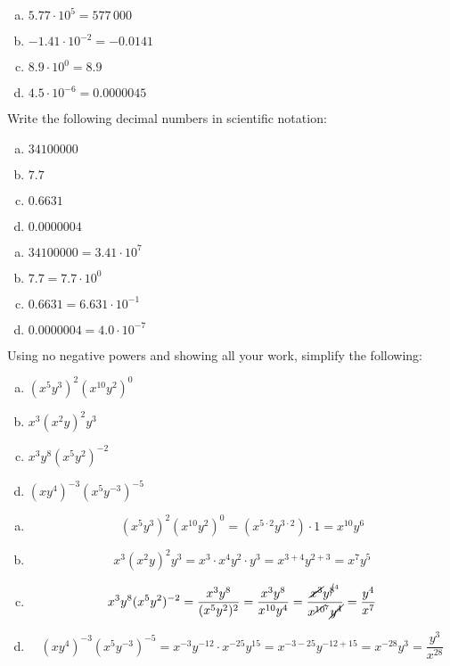 \documentclass[11pt,letterpaper]{article}
\begin{document}
\sol
\begin{enumerate}[(a)]
\item $5.77 \cdot 10^5= 577\,000$

\item $-1.41 \cdot 10^{-2}= -0.0141$

\item $8.9 \cdot 10^0= 8.9$

\item $4.5 \cdot 10^{-6}= 0.0000045$
\end{enumerate}



\newpage



 Write the following decimal numbers in scientific notation:
	\begin{enumerate}[(a)]
	\item $34100000$
	\item $7.7$
	\item $0.6631$
	\item $0.0000004$
	\end{enumerate} \pspace

\sol
\begin{enumerate}[(a)]
\item $34100000= 3.41 \cdot 10^7$
\item $7.7= 7.7 \cdot 10^0$
\item $0.6631= 6.631 \cdot 10^{-1}$
\item $0.0000004= 4.0 \cdot 10^{-7}$
\end{enumerate}



\newpage



 Using no negative powers and showing all your work, simplify the following:
	\begin{enumerate}[(a)]
	\item $(x^5 y^3)^2 (x^{10} y^2)^0$
	\item $x^3 (x^2y)^2 y^3$
	\item $x^3 y^8(x^5 y^2)^{-2}$
	\item $(xy^4)^{-3} (x^5 y^{-3})^{-5}$
	\end{enumerate} \pspace

\sol
\begin{enumerate}[(a)]
\item 
	\[
	(x^5 y^3)^2 (x^{10} y^2)^0= (x^{5 \cdot 2} y^{3 \cdot 2}) \cdot 1= x^{10} y^6
	\] \pspace

\item 
	\[
	x^3 (x^2y)^2 y^3= x^3 \cdot x^4 y^2 \cdot y^3= x^{3 + 4} y^{2 + 3}= x^7 y^5
	\] \pspace

\item 
	\[
	x^3 y^8(x^5 y^2)^{-2}= \dfrac{x^3 y^8}{(x^5 y^2)^2}= \dfrac{x^3 y^8}{x^{10} y^4}= \dfrac{\cancel{x^3} y^{\cancel{8}^4}}{x^{\cancel{10}^7} \cancel{y^4}}= \dfrac{y^4}{x^7}
	\] \pspace

\item 
	\[
	(xy^4)^{-3} (x^5 y^{-3})^{-5}= x^{-3} y^{-12} \cdot x^{-25} y^{15}= x^{-3 - 25} y^{-12 + 15}= x^{-28} y^3= \dfrac{y^3}{x^{28}}
	\]
\end{enumerate}
\end{document}
